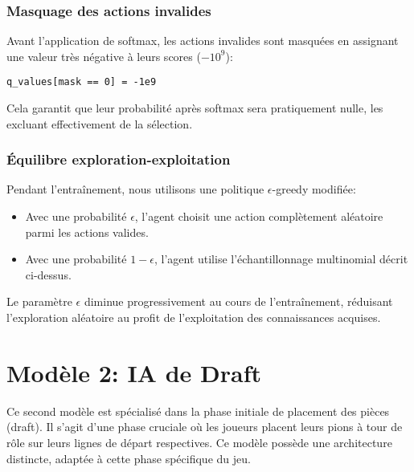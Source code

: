 \documentclass[]{article}
\begin{document}
\subsubsection{Masquage des actions invalides}
Avant l'application de softmax, les actions invalides sont masquées en assignant une valeur très négative à leurs scores (\(-10^9\)):

\begin{verbatim}
q_values[mask == 0] = -1e9
\end{verbatim}

Cela garantit que leur probabilité après softmax sera pratiquement nulle, les excluant effectivement de la sélection.

\subsubsection{Équilibre exploration-exploitation}
Pendant l'entraînement, nous utilisons une politique \(\epsilon\)-greedy modifiée:
\begin{itemize}
    \item Avec une probabilité \(\epsilon\), l'agent choisit une action complètement aléatoire parmi les actions valides.
    \item Avec une probabilité \(1-\epsilon\), l'agent utilise l'échantillonnage multinomial décrit ci-dessus.
\end{itemize}

Le paramètre \(\epsilon\) diminue progressivement au cours de l'entraînement, réduisant l'exploration aléatoire au profit de l'exploitation des connaissances acquises.



\section{Modèle 2: IA de Draft}
Ce second modèle est spécialisé dans la phase initiale de placement des pièces (draft). Il s'agit d'une phase cruciale où les joueurs placent leurs pions à tour de rôle sur leurs lignes de départ respectives. Ce modèle possède une architecture distincte, adaptée à cette phase spécifique du jeu.
\end{document}
